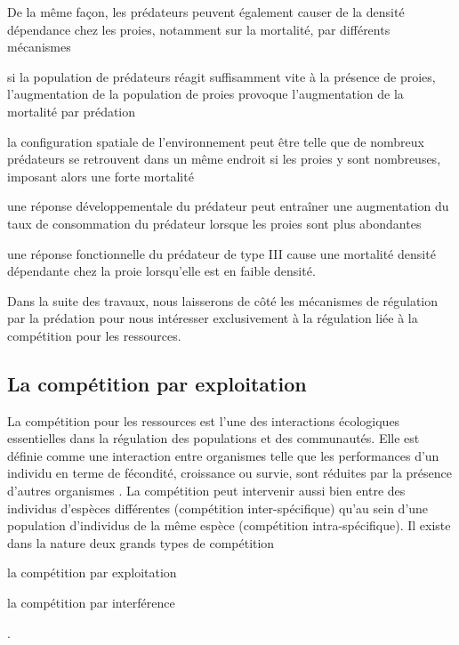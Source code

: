 De la même façon, les prédateurs peuvent également causer de la densité
dépendance chez les proies, notamment sur la mortalité, par différents
mécanismes \autocites{taylor1984a} \begin{enumerate*}[label=(\roman*),
before=\unskip{ : }, itemjoin={{ ; }}, itemjoin*={{ ; et }}] \item si la
population de prédateurs réagit suffisamment vite à la présence de proies,
l'augmentation de la population de proies provoque l'augmentation de la
mortalité par prédation \item la configuration spatiale de l'environnement peut
être telle que de nombreux prédateurs se retrouvent dans un même endroit si les
proies y sont nombreuses, imposant alors une forte mortalité \item une réponse
développementale du prédateur peut entraîner une augmentation du taux de
consommation du prédateur lorsque les proies sont plus abondantes \item une
réponse fonctionnelle du prédateur de type III \autocites{holling1965a} cause
une mortalité densité dépendante chez la proie lorsqu'elle est en faible
densité.
\end{enumerate*}

Dans la suite des travaux, nous laisserons de côté les mécanismes de régulation
par la prédation pour nous intéresser exclusivement à la régulation liée à la
compétition pour les ressources. 

\subsection{La compétition par exploitation}

La compétition pour les ressources est l'une des interactions écologiques
essentielles dans la régulation des populations et des communautés. Elle est définie comme une
interaction entre organismes telle que les performances d'un individu en terme
de fécondité, croissance ou survie, sont réduites par la présence d'autres
organismes \autocites{volterra1931a, gause1932a, park1948a, park1954a,
park1957a}.
La compétition peut intervenir aussi bien entre des individus d'espèces
différentes (compétition inter-spécifique) qu'au sein d'une population
d'individus de la même espèce (compétition intra-spécifique). 
Il existe dans la nature deux grands types de compétition
\begin{enumerate*}[label=(\roman*), before=\unskip{ : }, itemjoin={{ ; }},
itemjoin*={{ ; et }}] \item la compétition par exploitation \item la compétition
par interférence \end{enumerate*} \autocites{park1954a, park1962a, begon2009a}.

